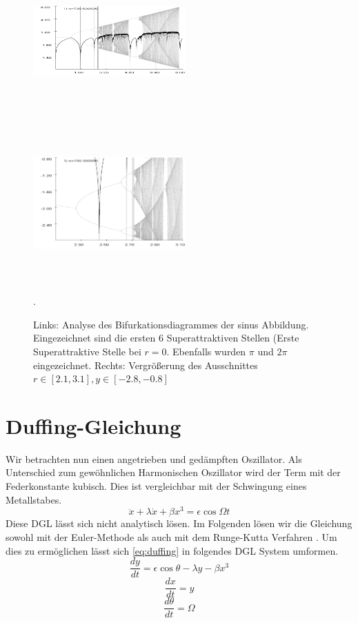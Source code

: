 \documentclass[12pt,a4paper]{article}
\begin{document}
\begin{figure}[!htbp]
\centering
\includegraphics[height=230px, width= 220px]{bifurkation-sin}
\includegraphics[height= 230px, width= 220px]{bifurkation-sin-zoom}
\caption{Links: Analyse des Bifurkationsdiagrammes der sinus Abbildung. Eingezeichnet sind die ersten 6 Superattraktiven Stellen (Erste Superattraktive Stelle bei $r=0$. Ebenfalls wurden $\pi$ und $2\pi$ eingezeichnet. Rechts: Vergrößerung des Ausschnittes $r \in [2.1,3.1], y\in[-2.8,-0.8]$}. 
\label{fig:bifurc-sin}
\end{figure}
\newpage
\section { Duffing-Gleichung}
Wir betrachten nun einen angetrieben und gedämpften Oszillator. Als Unterschied zum gewöhnlichen Harmonischen Oszillator wird der Term mit der Federkonstante kubisch. Dies ist vergleichbar mit der Schwingung eines Metallstabes.
\begin{equation}
\ddot{x}+\lambda\dot{x}+\beta x^3=\epsilon\cos{\Omega t}
\label{eq:duffing}
\end{equation} 
Diese DGL lässt sich nicht analytisch lösen.
Im Folgenden lösen wir die Gleichung sowohl mit der Euler-Methode \parencite{wiki:euler} als auch mit dem Runge-Kutta Verfahren \parencite{wiki:runge}. Um dies zu ermöglichen lässt sich \eqref{eq:duffing} in folgendes DGL System umformen.
\begin{equation}\frac{dy}{dt}=\epsilon\cos{\theta}-\lambda y - \beta x^3\end{equation}
\begin{equation}\frac{dx}{dt}=y\end{equation}
\begin{equation}\frac{d\theta}{dt}=\Omega\end{equation}
\newline
\end{document}
